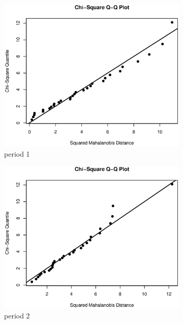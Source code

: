 \documentclass{article}
\begin{document}
\begin{enumerate}[leftmargin = 0 em, label = \arabic*., font = \bfseries]
\begin{figure}[!htb]
\begin{subfigure}[b]{0.33\textwidth}
		\includegraphics[width = \textwidth]{QQ_1.eps}
		\caption{period 1}
		\end{subfigure}%
		\begin{subfigure}[b]{0.33\textwidth}
		\includegraphics[width = \textwidth]{QQ_2.eps}
		\caption{period 2}
		\end{subfigure}%
		\begin{subfigure}[b]{0.33\textwidth}

\end{subfigure}
\end{figure}
\end{enumerate}
\end{document}
